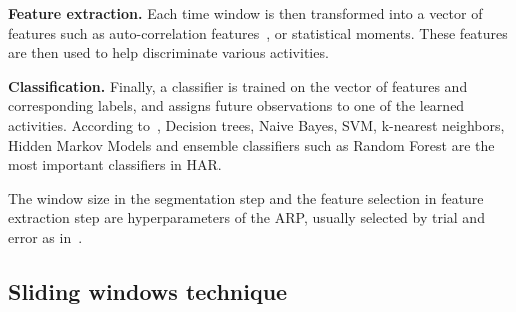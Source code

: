 \documentclass[sensors,article,submit,moreauthors,pdftex]{Definitions/mdpi}
\begin{document}
\noindent\textbf{Feature extraction.}
Each time window is then transformed into a vector of features such as auto-correlation features~\cite{morris2014recofit}, or statistical 
moments. These features are then used to help discriminate various activities.

\noindent\textbf{Classification.}
Finally, a classifier is trained on the vector of features and corresponding 
labels, and assigns future 
observations to one of the learned activities. According to~\cite{lara2013survey}, Decision trees, Naive Bayes, SVM, k-nearest neighbors, Hidden Markov Models and ensemble classifiers such as Random Forest are the most important classifiers in HAR.

The window size in the segmentation step and the feature selection in feature extraction step are hyperparameters of the ARP, usually 
selected by trial and error as in~\cite{banos2014window}.

    

\subsection{Sliding windows technique}
\end{document}
